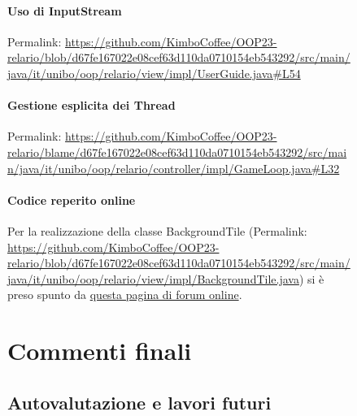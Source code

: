 \documentclass[a4paper,12pt]{report}
\begin{document}
\begin{figure}[H]
\subsubsection{Uso di InputStream}
Permalink: \url{https://github.com/KimboCoffee/OOP23-relario/blob/d67fe167022e08cef63d110da0710154eb543292/src/main/java/it/unibo/oop/relario/view/impl/UserGuide.java#L54}

\subsubsection{Gestione esplicita dei Thread}
Permalink: \url{https://github.com/KimboCoffee/OOP23-relario/blame/d67fe167022e08cef63d110da0710154eb543292/src/main/java/it/unibo/oop/relario/controller/impl/GameLoop.java#L32}

\subsubsection{Codice reperito online}
Per la realizzazione della classe BackgroundTile (Permalink:  \url{https://github.com/KimboCoffee/OOP23-relario/blob/d67fe167022e08cef63d110da0710154eb543292/src/main/java/it/unibo/oop/relario/view/impl/BackgroundTile.java}) si è preso spunto da \href{https://coderanch.com/t/336043/java/Images-top}{questa pagina di forum online}.

\chapter{Commenti finali}

\section{Autovalutazione e lavori futuri}


\end{figure}
\end{document}
